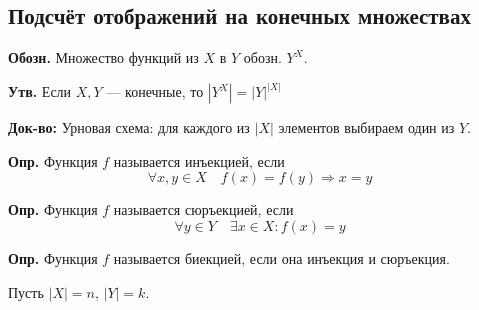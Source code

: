 \documentclass[10pt, a4paper]{article}
\begin{document}
\subsection*{Подсчёт отображений на конечных множествах}

\textbf{Обозн.} Множество функций из $X$ в $Y$ обозн. $Y^X$.

\medskip
\noindent
\textbf{Утв.} Если $X, Y$ — конечные, то $|Y^X| = |Y|^{|X|}$

\medskip
\noindent
\textbf{Док-во:} Урновая схема: для каждого из $|X|$ элементов выбираем один из $Y$.

\medskip
\noindent
\textbf{Опр.} Функция $f$ называется инъекцией, если
\[ \forall x,y \in X \quad f(x) = f(y) \Rightarrow x = y \]

\noindent
\textbf{Опр.} Функция $f$ называется сюръекцией, если
\[ \forall y \in Y \quad \exists x \in X : f(x) = y \]

\noindent
\textbf{Опр.} Функция $f$ называется биекцией, если она инъекция и сюръекция.

\bigskip
\noindent
Пусть $|X| = n$, $|Y| = k$.

\vspace{0.4cm}
\end{document}
